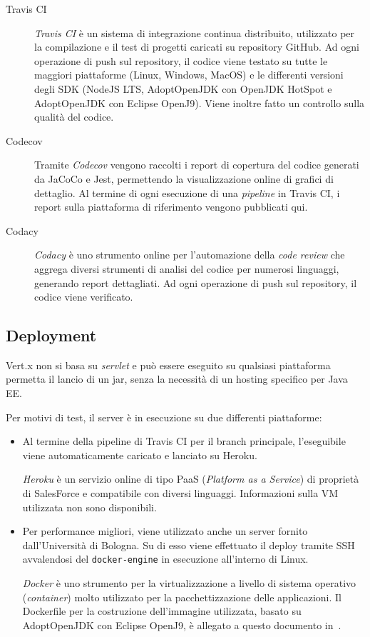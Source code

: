     \begin{description}
      \item[Travis CI]
        \emph{Travis CI} è un sistema di integrazione continua distribuito, utilizzato per la compilazione e il test di progetti caricati su repository GitHub.
        Ad ogni operazione di push sul repository, il codice viene testato su tutte le maggiori piattaforme (Linux, Windows, MacOS) e le differenti versioni degli SDK (NodeJS LTS, AdoptOpenJDK con OpenJDK HotSpot e AdoptOpenJDK con Eclipse OpenJ9).
        Viene inoltre fatto un controllo sulla qualità del codice.

      \item[Codecov]
        Tramite \emph{Codecov} vengono raccolti i report di copertura del codice generati da JaCoCo e Jest, permettendo la visualizzazione online di grafici di dettaglio.
        Al termine di ogni esecuzione di una \emph{pipeline} in Travis CI, i report sulla piattaforma di riferimento vengono pubblicati qui.

      \item[Codacy]
        \emph{Codacy} è uno strumento online per l'automazione della \emph{code review} che aggrega diversi strumenti di analisi del codice per numerosi linguaggi, generando report dettagliati.
        Ad ogni operazione di push sul repository, il codice viene verificato.
    \end{description}

  \subsection{Deployment}
    Vert.x non si basa su \emph{servlet} e può essere eseguito su qualsiasi piattaforma permetta il lancio di un jar, senza la necessità di un hosting specifico per Java EE\@.

    Per motivi di test, il server è in esecuzione su due differenti piattaforme:

    \begin{itemize}
      \item
        Al termine della pipeline di Travis CI per il branch principale, l'eseguibile viene automaticamente caricato e lanciato su Heroku.

        \emph{Heroku} è un servizio online di tipo PaaS (\emph{\emph{P}latform as a \emph{S}ervice}) di proprietà di SalesForce e compatibile con diversi linguaggi.
        Informazioni sulla VM utilizzata non sono disponibili.
      \item
        Per performance migliori, viene utilizzato anche un server fornito dall'Università di Bologna.
        Su di esso viene effettuato il deploy tramite SSH avvalendosi del \texttt{docker-engine} in esecuzione all'interno di Linux.

        \emph{Docker} è uno strumento per la virtualizzazione a livello di sistema operativo (\emph{container}) molto utilizzato per la pacchettizzazione delle applicazioni.
        Il Dockerfile per la costruzione dell'immagine utilizzata, basato su AdoptOpenJDK con Eclipse OpenJ9, è allegato a questo documento in~.
    \end{itemize}

